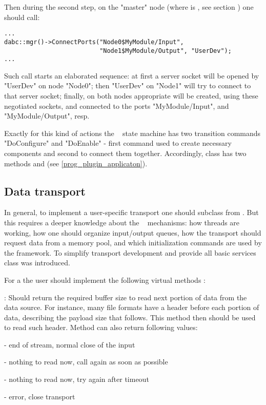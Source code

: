 Then during the second step, on the "master" node 
(where  is , 
see section )
one should call:
\begin{small}
\begin{verbatim}
...
dabc::mgr()->ConnectPorts("Node0$MyModule/Input", 
                          "Node1$MyModule/Output", "UserDev");
...
\end{verbatim}     
\end{small}
 
Such call starts an elaborated sequence: at first a server socket will be opened 
by  "UserDev" on node "Node0";
then  "UserDev" on "Node1" will try to connect to that server socket;
finally, on both nodes appropriate  
will be created, using these negotiated sockets,
and connected to the ports "MyModule/Input", and  "MyModule/Output", resp.

Exactly for this kind of actions the \dabc~ state machine has 
two transition commands "DoConfigure" and "DoEnable" - first command used to
create necessary components and second to connect them together. 
Accordingly, class
 has two methods  and 
 (see \ref{prog_plugin_applicaton}).  


\subsection{Data transport}
\label{prog_plugin_device_datatransport}
In general, to implement a user-specific transport one should subclass from
. But this requires a deeper knowledge 
about the \dabc~ mechanisms:
how threads are working,
how one should organize input/output queues, how the transport should request data from a
memory pool, and which initialization commands are used by the framework. 
To simplify transport development and provide all basic services 
class  was introduced.  

For a  the
user should implement the  following virtual methods : 

\bbul
\item [\func{Read\_Size()}] : 
   Should return the required buffer size to read next portion of data from
   the data source. For instance, many file formats have a header before
   each portion of data, describing the payload size that follows. 
   This method then should be used to read such header. 
   Method can also return following values:
   \bdes
   \item[\keyw{dabc::di\_EndOfStream}] - end of stream, normal close of the input
   \item[\keyw{dabc::di\_Repeat}]      - nothing to read now, call again as soon as possible
   \item[\keyw{dabc::di\_RepeatTimeout}] - nothing to read now, try again after timeout
   \item[\keyw{dabc::di\_Error}]         - error, close transport
   \edes

